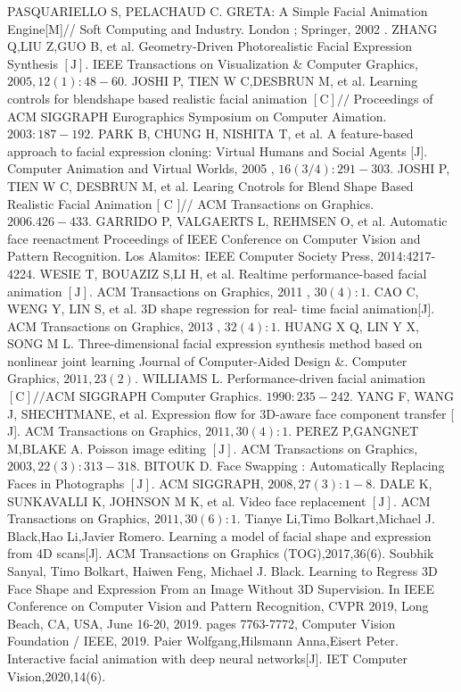 \documentclass{ctexart}
\begin{document}
\begin{thebibliography}{99}
PASQUARIELLO S, PELACHAUD C. GRETA: A Simple Facial Animation Engine[M]// Soft Computing and Industry. London ; Springer, 2002 .
ZHANG Q,LIU Z,GUO B, et al. Geometry-Driven Photorealistic Facial Expression Synthesis $[\mathrm{J}] .$ IEEE Transactions on Visualization \& Computer Graphics, $2005,12(1): 48-60 .$
JOSHI P, TIEN W C,DESBRUN M, et al. Learning controls for
blendshape based realistic facial animation $[\mathrm{C}] / /$ Proceedings of
ACM SIGGRAPH Eurographics Symposium on Computer Aimation. $2003: 187-192 .$
PARK B, CHUNG H, NISHITA T, et al. A feature-based approach to facial expression cloning: Virtual Humans and Social
Agents [J]. Computer Animation and Virtual Worlds, 2005 ,
$16(3 / 4): 291-303 .$
JOSHI P, TIEN W C, DESBRUN M, et al. Learing Cnotrols for
Blend Shape Based Realistic Facial Animation [ $\mathrm{C}$ ]// ACM
Transactions on Graphics. $2006.426-433 .$
GARRIDO P, VALGAERTS L, REHMSEN O, et al. Automatic
face reenactment
Proceedings of IEEE Conference on Computer Vision and Pattern Recognition. Los Alamitos: IEEE Computer Society Press, 2014:4217-4224.
WESIE T, BOUAZIZ S,LI H, et al. Realtime performance-based
facial animation $[\mathrm{J}]$. ACM Transactions on Graphics, 2011 ,
$30(4): 1 .$
CAO C, WENG Y, LIN S, et al. 3D shape regression for real-
time facial animation[J]. ACM Transactions on Graphics, 2013 ,
$32(4): 1 .$
HUANG X Q, LIN Y X, SONG M L. Three-dimensional facial
expression synthesis method based on nonlinear joint learning
Journal of Computer-Aided Design \&. Computer Graphics, $2011 , 23(2).$
WILLIAMS L. Performance-driven facial animation $[\mathrm{C}] / / \mathrm{ACM}$
SIGGRAPH Computer Graphics. $1990: 235-242 .$
YANG F, WANG J, SHECHTMANE, et al. Expression flow for
3D-aware face component transfer [ J]. ACM Transactions on
Graphics, $2011,30(4): 1$.
PEREZ P,GANGNET M,BLAKE A. Poisson image editing
$[\mathrm{J}]$. ACM Transactions on Graphics, $2003,22(3): 313-318$.
BITOUK D. Face Swapping : Automatically Replacing Faces in
Photographs $[\mathrm{J}] .$ ACM SIGGRAPH, $2008,27(3): 1-8$.
DALE K, SUNKAVALLI K, JOHNSON M $\mathrm{K}$, et al. Video face
replacement $[\mathrm{J}] .$ ACM Transactions on Graphics, $2011,30(6): 1 .$
Tianye Li,Timo Bolkart,Michael J. Black,Hao Li,Javier Romero. Learning a model of facial shape and expression from 4D scans[J]. ACM Transactions on Graphics (TOG),2017,36(6).
Soubhik Sanyal, Timo Bolkart, Haiwen Feng, Michael J. Black. Learning to Regress 3D Face Shape and Expression From an Image Without 3D Supervision. In IEEE Conference on Computer Vision and Pattern Recognition, CVPR 2019, Long Beach, CA, USA, June 16-20, 2019. pages 7763-7772, Computer Vision Foundation / IEEE, 2019.
Paier Wolfgang,Hilsmann Anna,Eisert Peter. Interactive facial animation with deep neural networks[J]. IET Computer Vision,2020,14(6).


\end{thebibliography}
\end{document}
